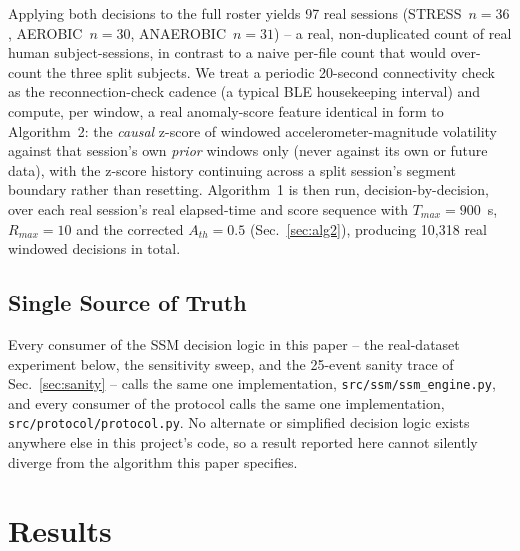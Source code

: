 \documentclass[conference]{IEEEtran}
\begin{document}
Applying both decisions to the full roster yields 97 real sessions
(STRESS~$n{=}36$, AEROBIC~$n{=}30$, ANAEROBIC~$n{=}31$) -- a real,
non-duplicated count of real human subject-sessions, in contrast to a
naive per-file count that would over-count the three split subjects. We
treat a periodic 20-second connectivity check as the reconnection-check
cadence (a typical BLE housekeeping interval) and compute, per window, a
real anomaly-score feature identical in form to Algorithm~2: the
\emph{causal} z-score of windowed accelerometer-magnitude volatility
against that session's own \emph{prior} windows only (never against its own
or future data), with the z-score history continuing across a split
session's segment boundary rather than resetting. Algorithm~1 is then run,
decision-by-decision, over each real session's real elapsed-time and score
sequence with $T_{max}=900$~s, $R_{max}=10$ and the corrected $A_{th}=0.5$
(Sec.~\ref{sec:alg2}), producing 10{,}318 real windowed decisions in total.

\subsection{Single Source of Truth}

Every consumer of the SSM decision logic in this paper -- the real-dataset
experiment below, the sensitivity sweep, and the 25-event sanity trace of
Sec.~\ref{sec:sanity} -- calls the same one implementation,
\texttt{src/ssm/ssm\_engine.py}, and every consumer of the protocol calls
the same one implementation, \texttt{src/protocol/protocol.py}. No
alternate or simplified decision logic exists anywhere else in this
project's code, so a result reported here cannot silently diverge from the
algorithm this paper specifies.

\section{Results}
\label{sec:results}
\end{document}
